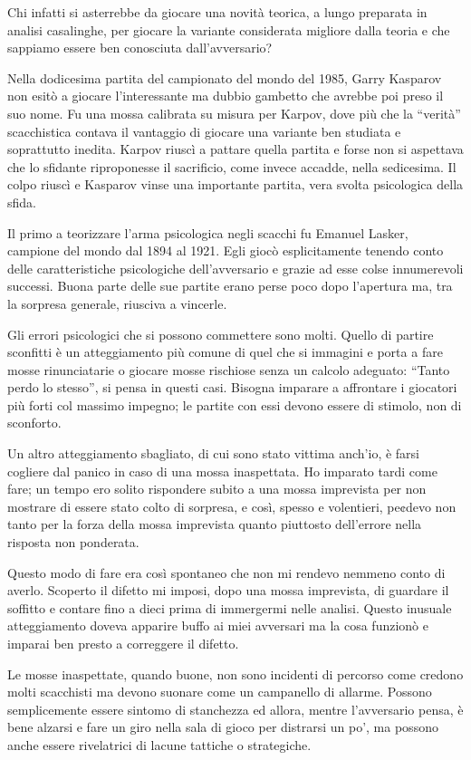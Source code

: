 \documentclass[
]{article}
\begin{document}
Chi infatti si asterrebbe da giocare una novità teorica, a lungo
preparata in analisi casalinghe, per giocare la variante considerata
migliore dalla teoria e che sappiamo essere ben conosciuta
dall'avversario?

Nella dodicesima partita del campionato del mondo del 1985, Garry
Kasparov non esitò a giocare l'interessante ma dubbio gambetto che
avrebbe poi preso il suo nome. Fu una mossa calibrata su misura per
Karpov, dove più che la ``verità'' scacchistica contava il vantaggio di
giocare una variante ben studiata e soprattutto inedita. Karpov riuscì a
pattare quella partita e forse non si aspettava che lo sfidante
riproponesse il sacrificio, come invece accadde, nella sedicesima. Il
colpo riuscì e Kasparov vinse una importante partita, vera svolta
psicologica della sfida.

Il primo a teorizzare l'arma psicologica negli scacchi fu Emanuel
Lasker, campione del mondo dal 1894 al 1921. Egli giocò esplicitamente
tenendo conto delle caratteristiche psicologiche dell'avversario e
grazie ad esse colse innumerevoli successi. Buona parte delle sue
partite erano perse poco dopo l'apertura ma, tra la sorpresa generale,
riusciva a vincerle.

Gli errori psicologici che si possono commettere sono molti. Quello di
partire sconfitti è un atteggiamento più comune di quel che si immagini
e porta a fare mosse rinunciatarie o giocare mosse rischiose senza un
calcolo adeguato: ``Tanto perdo lo stesso'', si pensa in questi casi.
Bisogna imparare a affrontare i giocatori più forti col massimo impegno;
le partite con essi devono essere di stimolo, non di sconforto.

Un altro atteggiamento sbagliato, di cui sono stato vittima anch'io, è
farsi cogliere dal panico in caso di una mossa inaspettata. Ho imparato
tardi come fare; un tempo ero solito rispondere subito a una mossa
imprevista per non mostrare di essere stato colto di sorpresa, e così,
spesso e volentieri, pe¢devo non tanto per la forza della mossa
imprevista quanto piuttosto dell'errore nella risposta non ponderata.

Questo modo di fare era così spontaneo che non mi rendevo nemmeno conto
di averlo. Scoperto il difetto mi imposi, dopo una mossa imprevista, di
guardare il soffitto e contare fino a dieci prima di immergermi nelle
analisi. Questo inusuale atteggiamento doveva apparire buffo ai miei
avversari ma la cosa funzionò e imparai ben presto a correggere il
difetto.

Le mosse inaspettate, quando buone, non sono incidenti di percorso come
credono molti scacchisti ma devono suonare come un campanello di
allarme. Possono semplicemente essere sintomo di stanchezza ed allora,
mentre l'avversario pensa, è bene alzarsi e fare un giro nella sala di
gioco per distrarsi un po', ma possono anche essere rivelatrici di
lacune tattiche o strategiche.
\end{document}
